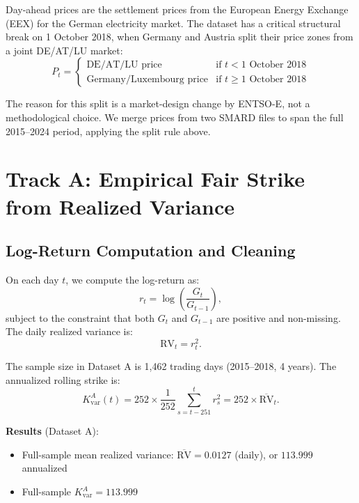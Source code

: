 \documentclass[11pt, a4paper, twoside]{article}
\begin{document}
Day-ahead prices are the settlement prices from the European Energy Exchange (EEX) for the German electricity market. The dataset has a critical structural break on 1 October 2018, when Germany and Austria split their price zones from a joint DE/AT/LU market:
\begin{equation}
P_t = \begin{cases}
\text{DE/AT/LU price} & \text{if } t < 1 \text{ October 2018} \\
\text{Germany/Luxembourg price} & \text{if } t \geq 1 \text{ October 2018}
\end{cases}
\end{equation}

The reason for this split is a market-design change by ENTSO-E, not a methodological choice. We merge prices from two SMARD files to span the full 2015--2024 period, applying the split rule above.

\section{Track A: Empirical Fair Strike from Realized Variance}

\subsection{Log-Return Computation and Cleaning}

On each day $t$, we compute the log-return as:
\begin{equation}
r_t = \log\left(\frac{G_t}{G_{t-1}}\right),
\end{equation}
subject to the constraint that both $G_t$ and $G_{t-1}$ are positive and non-missing. The daily realized variance is:
\begin{equation}
\text{RV}_t = r_t^2.
\end{equation}

The sample size in Dataset A is 1,462 trading days (2015--2018, 4 years). The annualized rolling strike is:
\begin{equation}
K_{\text{var}}^A(t) = 252 \times \frac{1}{252} \sum_{s=t-251}^{t} r_s^2 = 252 \times \overline{\text{RV}}_t.
\end{equation}

\textbf{Results} (Dataset A):
\begin{itemize}
\item Full-sample mean realized variance: $\overline{\text{RV}} = 0.0127$ (daily), or $113.999$ annualized
\item Full-sample $K_{\text{var}}^A = 113.999$
\end{itemize}
\end{document}
